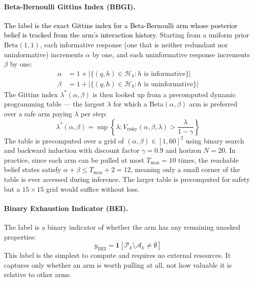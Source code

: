 \documentclass[11pt]{article}
\newcommand{\an}[1]{\textcolor{black}{#1}}
\theoremstyle{plain}
\theoremstyle{definition}
\theoremstyle{remark}
\begin{document}
\paragraph{Beta-Bernoulli Gittins Index (BBGI).}
\an{The label is the exact Gittins index for a Beta-Bernoulli arm whose 
posterior belief is tracked from the arm's interaction history.} Starting 
from a uniform prior $\text{Beta}(1, 1)$, each informative response 
(one that is neither redundant nor uninformative) increments $\alpha$ by 
one, and each uninformative response increments $\beta$ by one:
\begin{align}
    \alpha &= 1 + |\{(q, h) \in \mathcal{H}_k : h \text{ is informative}\}| \\
    \beta  &= 1 + |\{(q, h) \in \mathcal{H}_k : h \text{ is uninformative}\}|
\end{align}
The Gittins index $\lambda^*(\alpha, \beta)$ is then looked up from a 
precomputed dynamic programming table — the largest $\lambda$ for which 
a Beta$(\alpha, \beta)$ arm is preferred over a safe arm paying $\lambda$ 
per step:
\begin{equation}
    \lambda^*(\alpha, \beta) = \sup \left\{ \lambda : 
    V_{\text{risky}}(\alpha, \beta, \lambda) > \frac{\lambda}{1 - \gamma} \right\}
\end{equation}
The table is precomputed over a grid of $(\alpha, \beta) \in [1, 60]^2$ 
using binary search and backward induction with discount factor $\gamma = 0.9$ 
and horizon $N = 20$. In practice, since each arm can be pulled at most 
$T_{\max} = 10$ times, the reachable belief states satisfy 
$\alpha + \beta \leq T_{\max} + 2 = 12$, meaning only a small corner of 
the table is ever accessed during inference. The larger table is precomputed 
for safety but a $15 \times 15$ grid would suffice without loss.

\paragraph{Binary Exhaustion Indicator (BEI).}
The label is a binary indicator of whether the arm has any remaining 
unasked properties:
\begin{equation}
    y_{\text{BEI}} = \mathbf{1}\left[\mathcal{P}_k \setminus \mathcal{A}_k \neq \emptyset\right]
\end{equation}
This label is the simplest to compute and requires no external resources. 
It captures only whether an arm is worth pulling at all, not how valuable 
it is relative to other arms.
\end{document}
